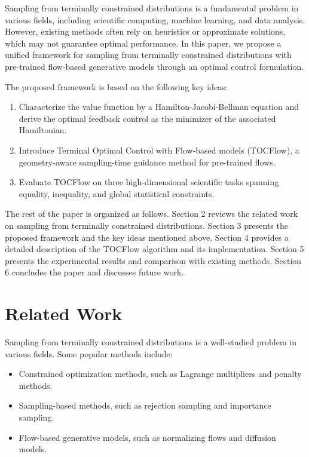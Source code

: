 \documentclass{article}
\begin{document}
        Sampling from terminally constrained distributions is a fundamental problem in various fields, including scientific computing, machine learning, and data analysis. However, existing methods often rely on heuristics or approximate solutions, which may not guarantee optimal performance. In this paper, we propose a unified framework for sampling from terminally constrained distributions with pre-trained flow-based generative models through an optimal control formulation.

        The proposed framework is based on the following key ideas:

        \begin{enumerate}
        \item Characterize the value function by a Hamilton-Jacobi-Bellman equation and derive the optimal feedback control as the minimizer of the associated Hamiltonian.
        \item Introduce Terminal Optimal Control with Flow-based models (TOCFlow), a geometry-aware sampling-time guidance method for pre-trained flows.
        \item Evaluate TOCFlow on three high-dimensional scientific tasks spanning equality, inequality, and global statistical constraints.
        \end{enumerate}

        The rest of the paper is organized as follows. Section 2 reviews the related work on sampling from terminally constrained distributions. Section 3 presents the proposed framework and the key ideas mentioned above. Section 4 provides a detailed description of the TOCFlow algorithm and its implementation. Section 5 presents the experimental results and comparison with existing methods. Section 6 concludes the paper and discusses future work.

        \section{Related Work}

        Sampling from terminally constrained distributions is a well-studied problem in various fields. Some popular methods include:

        \begin{itemize}
        \item Constrained optimization methods, such as Lagrange multipliers and penalty methods.
        \item Sampling-based methods, such as rejection sampling and importance sampling.
        \item Flow-based generative models, such as normalizing flows and diffusion models.
        \end{itemize}
\end{document}
